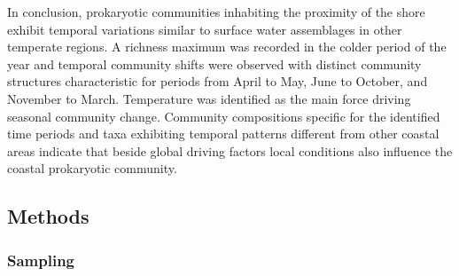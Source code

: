 \documentclass[
  12pt,
]{article}
\begin{document}
In conclusion, prokaryotic communities inhabiting the proximity of the
shore exhibit temporal variations similar to surface water assemblages
in other temperate regions. A richness maximum was recorded in the
colder period of the year and temporal community shifts were observed
with distinct community structures characteristic for periods from April
to May, June to October, and November to March. Temperature was
identified as the main force driving seasonal community change.
Community compositions specific for the identified time periods and taxa
exhibiting temporal patterns different from other coastal areas indicate
that beside global driving factors local conditions also influence the
coastal prokaryotic community.

\newpage

\hypertarget{methods}{%
\subsection{Methods}\label{methods}}

\hypertarget{sampling}{%
\subsubsection{Sampling}\label{sampling}}
\end{document}
